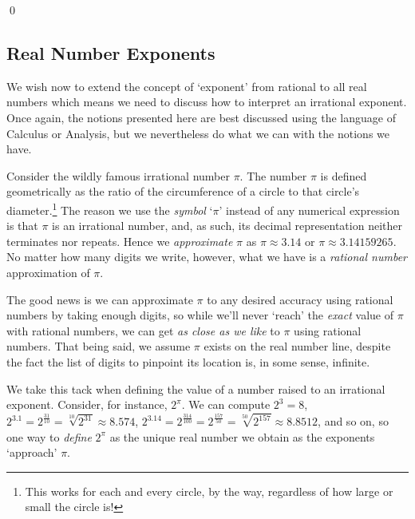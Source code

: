 \documentclass{ximera}
\begin{document}
\begin{example}
\begin{enumerate}
\begin{image}

\end{image}

\begin{center}
\end{center} 

\qed

\end{enumerate}

\end{example}

\subsection{Real Number Exponents}

We wish now to extend the concept of `exponent' from rational to all real numbers which means we need to discuss how to interpret an irrational exponent.  Once again, the notions presented here are best discussed using the language of Calculus or Analysis, but we nevertheless do what we can with the notions we have.  

Consider  the wildly famous irrational number $\pi$.  The number $\pi$ is defined geometrically as the ratio of the circumference of a circle to that circle's diameter.\footnote{This works for each and every circle, by the way, regardless of how large or small the circle is!} The reason we use the \textit{symbol} `$\pi$' instead of any numerical expression is that $\pi$ is an irrational number, and, as such, its decimal representation neither terminates nor repeats.  Hence we \textit{approximate} $\pi$ as $\pi \approx 3.14$ or $\pi \approx 3.14159265$.  No matter how many digits we write, however, what we have is a \textit{rational number} approximation of $\pi$. 


The good news is we can approximate $\pi$ to any desired accuracy using rational numbers by taking enough digits, so while we'll never `reach' the \textit{exact} value of $\pi$ with rational numbers, we can get \textit{as close as we like} to $\pi$ using rational numbers.  That being said, we assume $\pi$ exists on the real number line, despite the fact the list of digits to pinpoint its location is, in some sense, infinite.

We take this tack  when defining the value of a number raised to an irrational exponent.  Consider, for instance, $2^{\pi}$.  We can compute $2^3 = 8$, $2^{3.1} = 2^{\frac{31}{10}} = \sqrt[10]{2^{31}} \approx 8.574 $, $2^{3.14} = 2^{\frac{314}{100}} = 2^{\frac{157}{50}} = \sqrt[50]{2^{157}} \approx 8.8512$, and so on, so one way to  \textit{define} $2^{\pi}$ as the unique real number we obtain  as the exponents `approach' $\pi$. 
\end{document}
